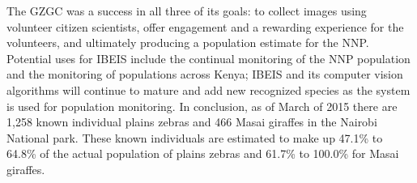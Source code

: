The GZGC was a success in all three of its goals: to collect images using volunteer citizen scientists, offer engagement and a rewarding experience for the volunteers, and ultimately producing a population estimate for the NNP.  Potential uses for IBEIS include the continual monitoring of the NNP population and the monitoring of populations across Kenya; IBEIS and its computer vision algorithms will continue to mature and add new recognized species as the system is used for population monitoring.  In conclusion, as of March of 2015 there are 1,258 known individual plains zebras and 466 Masai giraffes in the Nairobi National park.  These known individuals are estimated to make up 47.1\% to 64.8\% of the actual population of plains zebras and 61.7\% to 100.0\% for Masai giraffes.
